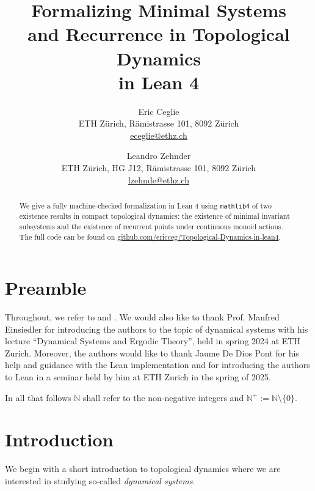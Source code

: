 \documentclass[11pt]{article}
\title{{\huge\bfseries Formalizing Minimal Systems \\ and Recurrence in Topological Dynamics \\ in Lean 4}}
\author{%
  Eric Ceglie\\
  ETH Zürich, Rämistrasse 101, 8092 Zürich\\
  \href{mailto:eceglie@student.ethz.ch}{eceglie@ethz.ch}
  \and
  Leandro Zehnder\\
  ETH Zürich, HG J12, Rämistrasse 101, 8092 Zürich\\
  \href{mailto:lzehnde@student.ethz.ch}{lzehnde@ethz.ch}
}
\theoremstyle{definition}              %
\theoremstyle{definition}              %
\theoremstyle{definition}              %
\begin{document}
\maketitle


\pagebreak
\begin{abstract}
\noindent
We give a fully machine-checked formalization in Lean 4 using \verb|mathlib4| of two existence results in compact topological dynamics: the existence of minimal invariant subsystems and the existence of recurrent points under continuous monoid actions. The full code can be found on \href{https://github.com/ericceg/Topological-Dynamics-in-lean4}{github.com/ericceg/Topological-Dynamics-in-lean4}.
\end{abstract}




\pagebreak
\tableofcontents

\pagebreak

\newpage
{}

\section*{Preamble}
Throughout, we refer to \cite[Section 2]{brin2002introduction} and \cite[Exercises 4.2.1 and 4.2.2]{einsiedler2010ergodic}.
We would also like to thank Prof. Manfred Einsiedler for introducing the authors to the topic of dynamical systems with his lecture “Dynamical Systems and Ergodic Theory”, held in spring 2024 at ETH Zurich. Moreover, the authors would like to thank Jaume De Dios Pont for his help and guidance with the Lean implementation and for introducing the authors to Lean in a seminar held by him at ETH Zurich in the spring of 2025. 
\newpage


In all that follows $\mathbb{N}$ shall refer to the non-negative integers and $\mathbb{N}^+:=\mathbb{N} \setminus \{0\}$.

\section{Introduction}\label{chap1}
We begin with a short introduction to topological dynamics where we are interested in studying so-called \emph{dynamical systems}.
\end{document}

